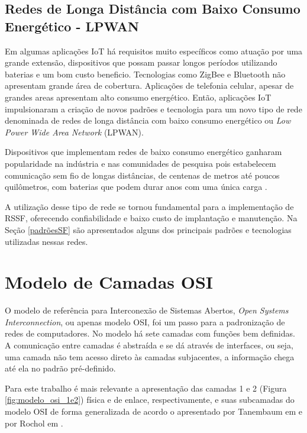\subsection{Redes de Longa Distância com Baixo Consumo Energético - LPWAN}
Em algumas aplicações IoT há requisitos muito específicos como atuação por uma grande extensão, dispositivos que possam passar longos períodos utilizando baterias e um bom custo beneficio. Tecnologias como ZigBee e Bluetooth não apresentam grande área de cobertura. Aplicações de telefonia celular, apesar de grandes areas apresentam alto consumo energético.  Então, aplicações IoT impulsionaram a criação de novos padrões e tecnologia para um novo tipo de rede denominada de redes de longa distância com baixo consumo energético ou \emph{Low Power Wide Area Network} (LPWAN).

Dispositivos que implementam redes de baixo consumo energético ganharam popularidade na indústria e nas comunidades de pesquisa pois estabelecem comunicação sem fio de longas distâncias, de centenas de metros até poucos quilômetros, com baterias que podem durar anos com uma única carga \cite{mekki2019comparative}.

A utilização desse tipo de rede se tornou fundamental para a implementação de RSSF, oferecendo confiabilidade e baixo custo de implantação e manutenção. Na Seção \ref{padrõesSF} são apresentados alguns dos principais padrões e tecnologias utilizadas nessas redes.

\section{Modelo de Camadas OSI}
\label{osi}
O modelo de referência para Interconexão de Sistemas Abertos, \emph{Open Systems Interconnection}, ou apenas modelo OSI, foi um passo para a padronização de redes de computadores. No modelo há sete camadas com funções bem definidas. A comunicação entre camadas é abstraída e se dá através de interfaces, ou seja, uma camada não tem acesso direto às camadas subjacentes, a informação chega até ela no padrão pré-definido.

Para este trabalho é mais relevante a apresentação das camadas 1 e 2 (Figura \ref{fig:modelo_osi_1e2})  física e de enlace, respectivamente, e suas subcamadas do modelo OSI de forma generalizada de acordo o apresentado por Tanembaum em \cite{tanembaum2011} e por Rochol em \cite{rochol2018sistemas}.

